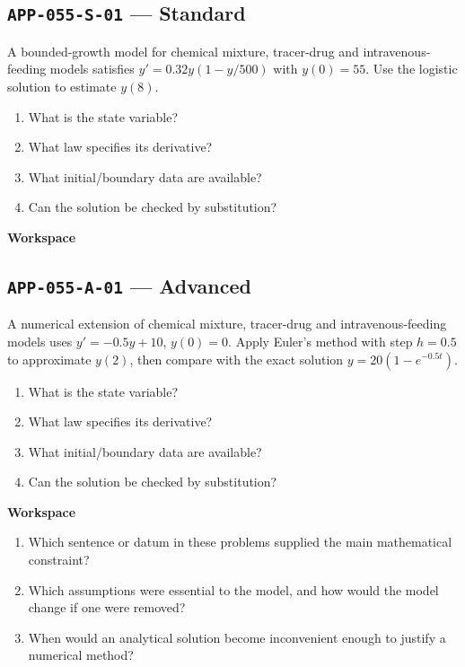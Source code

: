 \documentclass[11pt]{book}
\newcommand{\pid}[1]{\texttt{#1}}
\newcommand{\workspace}{\par\vspace{0.7in}\hrulefill\par\vspace{0.55in}\hrulefill\par}
\begin{document}
\subsection*{\pid{APP-055-S-01} — Standard}
\begin{problembox}
A bounded-growth model for chemical mixture, tracer-drug and intravenous-feeding models satisfies $y'=0.32y(1-y/500)$ with $y(0)=55$. Use the logistic solution to estimate $y(8)$.
\end{problembox}
\begin{promptbox}\begin{enumerate}
\item What is the state variable?
\item What law specifies its derivative?
\item What initial/boundary data are available?
\item Can the solution be checked by substitution?
\end{enumerate}\end{promptbox}
\textbf{Workspace}\workspace
{}
\subsection*{\pid{APP-055-A-01} — Advanced}
\begin{problembox}
A numerical extension of chemical mixture, tracer-drug and intravenous-feeding models uses $y'=-0.5y+10$, $y(0)=0$. Apply Euler's method with step $h=0.5$ to approximate $y(2)$, then compare with the exact solution $y=20(1-e^{-0.5t})$.
\end{problembox}
\begin{promptbox}\begin{enumerate}
\item What is the state variable?
\item What law specifies its derivative?
\item What initial/boundary data are available?
\item Can the solution be checked by substitution?
\end{enumerate}\end{promptbox}
\textbf{Workspace}\workspace
\begin{reflectionbox}\begin{enumerate}
\item Which sentence or datum in these problems supplied the main mathematical constraint?
\item Which assumptions were essential to the model, and how would the model change if one were removed?
\item When would an analytical solution become inconvenient enough to justify a numerical method?
\end{enumerate}\end{reflectionbox}
\end{document}
